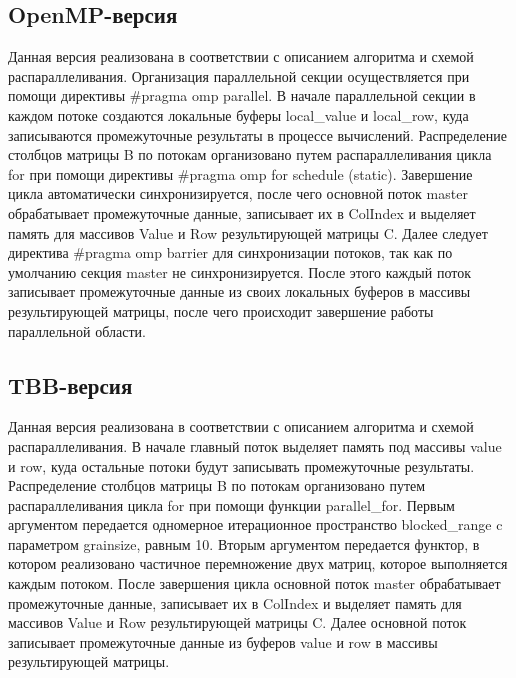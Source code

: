 \documentclass{report}
\begin{document}
\subsection*{OpenMP-версия}
\par Данная версия реализована в соответствии с описанием алгоритма и схемой распараллеливания. Организация параллельной секции осуществляется при помощи директивы \#pragma omp parallel. В начале параллельной секции в каждом потоке создаются локальные буферы local\_value и local\_row, куда записываются промежуточные результаты в процессе вычислений. Распределение столбцов матрицы B по потокам организовано путем распараллеливания цикла for при помощи директивы \#pragma omp for schedule (static). Завершение цикла автоматически синхронизируется, после чего основной поток master обрабатывает промежуточные данные, записывает их в ColIndex и выделяет память для массивов Value и Row результирующей матрицы C. Далее следует директива \#pragma omp barrier для синхронизации потоков, так как по умолчанию секция master не синхронизируется. После этого каждый поток записывает промежуточные данные из своих локальных буферов в массивы результирующей матрицы, после чего происходит завершение работы параллельной области.

\subsection*{TBB-версия}
\par Данная версия реализована в соответствии с описанием алгоритма и схемой распараллеливания. В начале главный поток выделяет память под массивы value и row, куда остальные потоки будут записывать промежуточные результаты. Распределение столбцов матрицы B по потокам организовано путем распараллеливания цикла for при помощи функции parallel\_for. Первым аргументом передается одномерное итерационное пространство blocked\_range c параметром grainsize, равным 10. Вторым аргументом передается функтор, в котором реализовано частичное перемножение двух матриц, которое выполняется каждым потоком. После завершения цикла основной поток master обрабатывает промежуточные данные, записывает их в ColIndex и выделяет память для массивов Value и Row результирующей матрицы C. Далее основной поток записывает промежуточные данные из буферов value и row в массивы результирующей матрицы.
\newpage
\end{document}
